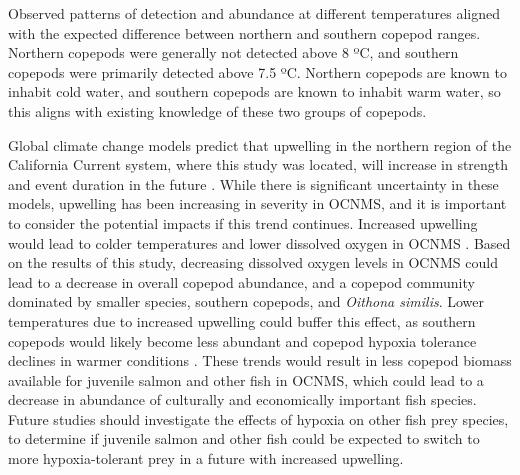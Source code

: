 \documentclass[12pt,twoside]{reedthesis}
\begin{document}
	Observed patterns of detection and abundance at different temperatures aligned with the expected difference between northern and southern copepod ranges. Northern copepods were generally not detected above 8 ºC, and southern copepods were primarily detected above 7.5 ºC. Northern copepods are known to inhabit cold water, and southern copepods are known to inhabit warm water, so this aligns with existing knowledge of these two groups of copepods. 
	
	Global climate change models predict that upwelling in the northern region of the California Current system, where this study was located, will increase in strength and event duration in the future \autocite{Bograd2023}. While there is significant uncertainty in these models, upwelling has been increasing in severity in OCNMS, and it is important to consider the potential impacts if this trend continues. Increased upwelling would lead to colder temperatures and lower dissolved oxygen in OCNMS \autocite{Bograd2023}. Based on the results of this study, decreasing dissolved oxygen levels in OCNMS could lead to a decrease in overall copepod abundance, and a copepod community dominated by smaller species, southern copepods, and \textit{Oithona similis}. Lower temperatures due to increased upwelling could buffer this effect, as southern copepods would likely become less abundant and copepod hypoxia tolerance declines in warmer conditions \autocite{Vaquer-Sunyer2011}. These trends would result in less copepod biomass available for juvenile salmon and other fish in OCNMS, which could lead to a decrease in abundance of culturally and economically important fish species. Future studies should investigate the effects of hypoxia on other fish prey species, to determine if juvenile salmon and other fish could be expected to switch to more hypoxia-tolerant prey in a future with increased upwelling.
	
\end{document}
